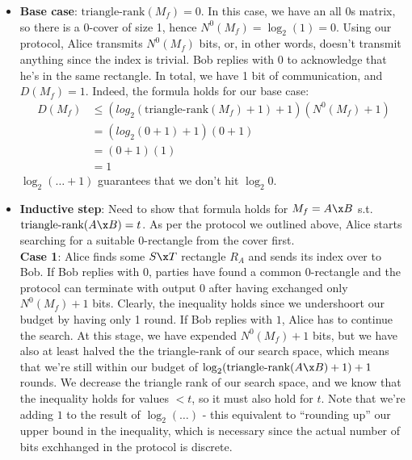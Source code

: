 \documentclass{article}
\newcommand\tr{\textrm{triangle-rank}}
\begin{document}
\begin{enumerate}
\begin{enumerate}
\begin{itemize}
                \item \textbf{Base case}: $\tr(M_f) = 0$. In this case, we have
                    an all $0$s matrix, so there is a 0-cover of size 1, hence
                    $N^0(M_f) = \log_2(1) = 0$. Using our protocol, Alice
                    transmits $N^0(M_f)$ bits, or, in other words, doesn't
                    transmit anything since the index is trivial. Bob replies
                    with 0 to acknowledge that he's in the same rectangle. In
                    total, we have 1 bit of communication, and $D(M_f) = 1$.
                    Indeed, the formula holds for our base case:
                    \begin{align*}
                        D(M_f) &\leq (log_2(\tr(M_f) + 1) +1) (N^0(M_f) + 1)
                            \\ &= (log_2(0 + 1) +1) (0 + 1)
                            \\ &= (0+1) (1)
                            \\ &= 1
                    \end{align*}
                    $\log_2(\ldots + 1)$ guarantees that we don't hit $\log_2
                    0$.
                    \\

                \item \textbf{Inductive step}: Need to show that formula holds
                    for $M_f = A \x B$ s.t. $\tr(A \x B) = t$. As per the
                    protocol we outlined above, Alice starts searching for a
                    suitable 0-rectangle from the cover first.
                    \\

                    \textbf{Case 1}: Alice finds some $S \x T$ rectangle $R_A$
                    and sends its index over to Bob. If Bob replies with $0$,
                    parties have found a common 0-rectangle and the protocol
                    can terminate with output $0$ after having exchanged only
                    $N^0(M_f) + 1$ bits. Clearly, the inequality holds since we
                    undershoort our budget by having only 1 round. If Bob
                    replies with $1$, Alice has to continue the search. At this
                    stage, we have expended $N^0(M_f) + 1$ bits, but we have
                    also at least halved the the triangle-rank of our search
                    space, which means that we're still within our budget of
                    $\log_2 ( \tr(A \x B) + 1) + 1$ rounds. We decrease the
                    triangle rank of our search space, and we know that the
                    inequality holds for values $< t$, so it must also hold for
                    $t$. Note that we're adding $1$ to the result of $\log_2
                    (\ldots)$ - this equivalent to ``rounding up'' our upper
                    bound in the inequality, which is necessary since the
                    actual number of bits exchhanged in the protocol is
                    discrete.
                    \\


\end{itemize}
\end{enumerate}
\end{enumerate}
\end{document}
